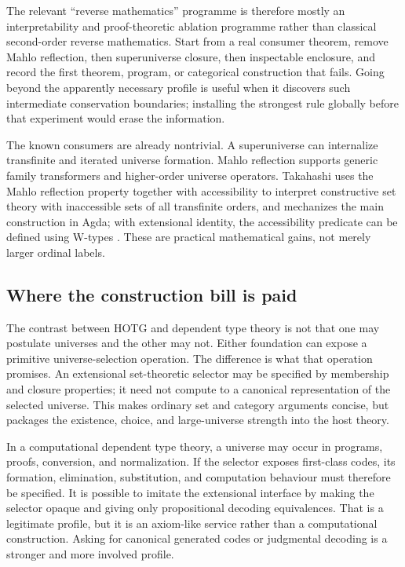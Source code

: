 \documentclass[11pt]{article}
\theoremstyle{definition}
\theoremstyle{remark}
\begin{document}
The relevant ``reverse mathematics'' programme is therefore mostly an
interpretability and proof-theoretic ablation programme rather than classical
second-order reverse mathematics.  Start from a real consumer theorem, remove
Mahlo reflection, then superuniverse closure, then inspectable enclosure, and
record the first theorem, program, or categorical construction that fails.
Going beyond the apparently necessary profile is useful when it discovers such
intermediate conservation boundaries; installing the strongest rule globally
before that experiment would erase the information.

The known consumers are already nontrivial.  A superuniverse can internalize
transfinite and iterated universe formation.  Mahlo reflection supports generic
family transformers and higher-order universe operators.  Takahashi uses the
Mahlo reflection property together with accessibility to interpret constructive
set theory with inaccessible sets of all transfinite orders, and mechanizes the
main construction in Agda; with extensional identity, the accessibility
predicate can be defined using W-types
\cite{RathjenGrifforPalmgren,TakahashiInaccessible}.  These are practical
mathematical gains, not merely larger ordinal labels.

\subsection{Where the construction bill is paid}

The contrast between HOTG and dependent type theory is not that one may postulate
universes and the other may not.  Either foundation can expose a primitive
universe-selection operation.  The difference is what that operation promises.
An extensional set-theoretic selector may be specified by membership and closure
properties; it need not compute to a canonical representation of the selected
universe.  This makes ordinary set and category arguments concise, but packages
the existence, choice, and large-universe strength into the host theory.

In a computational dependent type theory, a universe may occur in programs,
proofs, conversion, and normalization.  If the selector exposes first-class
codes, its formation, elimination, substitution, and computation behaviour must
therefore be specified.  It is possible to imitate the extensional interface by
making the selector opaque and giving only propositional decoding equivalences.
That is a legitimate profile, but it is an axiom-like service rather than a
computational construction.  Asking for canonical generated codes or
judgmental decoding is a stronger and more involved profile.
\end{document}
